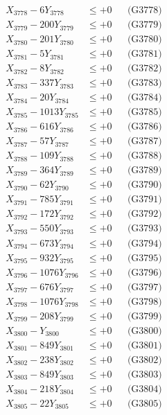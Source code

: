 \documentclass[a4paper,10pt]{article}
\begin{document}
{\begin{align}
X_{3778} - 6Y_{3778} &\leq +0 && \text{(G3778)} \\
X_{3779} - 200Y_{3779} &\leq +0 && \text{(G3779)} \\
X_{3780} - 201Y_{3780} &\leq +0 && \text{(G3780)} \\
\allowbreak
X_{3781} - 5Y_{3781} &\leq +0 && \text{(G3781)} \\
X_{3782} - 8Y_{3782} &\leq +0 && \text{(G3782)} \\
X_{3783} - 337Y_{3783} &\leq +0 && \text{(G3783)} \\
X_{3784} - 20Y_{3784} &\leq +0 && \text{(G3784)} \\
X_{3785} - 1013Y_{3785} &\leq +0 && \text{(G3785)} \\
X_{3786} - 616Y_{3786} &\leq +0 && \text{(G3786)} \\
X_{3787} - 57Y_{3787} &\leq +0 && \text{(G3787)} \\
X_{3788} - 109Y_{3788} &\leq +0 && \text{(G3788)} \\
X_{3789} - 364Y_{3789} &\leq +0 && \text{(G3789)} \\
X_{3790} - 62Y_{3790} &\leq +0 && \text{(G3790)} \\
\allowbreak
X_{3791} - 785Y_{3791} &\leq +0 && \text{(G3791)} \\
X_{3792} - 172Y_{3792} &\leq +0 && \text{(G3792)} \\
X_{3793} - 550Y_{3793} &\leq +0 && \text{(G3793)} \\
X_{3794} - 673Y_{3794} &\leq +0 && \text{(G3794)} \\
X_{3795} - 932Y_{3795} &\leq +0 && \text{(G3795)} \\
X_{3796} - 1076Y_{3796} &\leq +0 && \text{(G3796)} \\
X_{3797} - 676Y_{3797} &\leq +0 && \text{(G3797)} \\
X_{3798} - 1076Y_{3798} &\leq +0 && \text{(G3798)} \\
X_{3799} - 208Y_{3799} &\leq +0 && \text{(G3799)} \\
X_{3800} - Y_{3800} &\leq +0 && \text{(G3800)} \\
\allowbreak
X_{3801} - 849Y_{3801} &\leq +0 && \text{(G3801)} \\
X_{3802} - 238Y_{3802} &\leq +0 && \text{(G3802)} \\
X_{3803} - 849Y_{3803} &\leq +0 && \text{(G3803)} \\
X_{3804} - 218Y_{3804} &\leq +0 && \text{(G3804)} \\
X_{3805} - 22Y_{3805} &\leq +0 && \text{(G3805)} \\

\end{align}}
\end{document}
